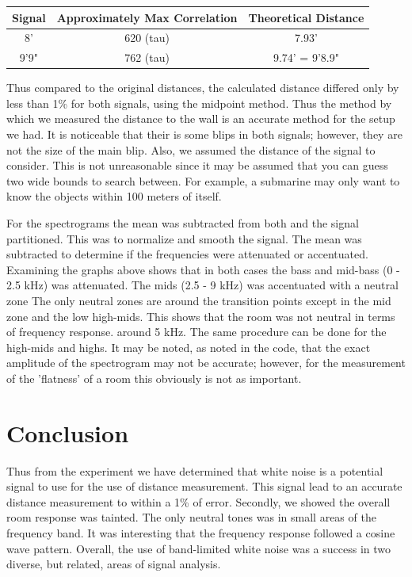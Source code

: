 \documentclass{article}
\begin{document}
      \begin{tabular}{|c|c|c|}
         \hline
         Signal & Approximately Max Correlation & Theoretical Distance \\
         \hline
         8' & 620 (tau) & 7.93'\\
         9'9" & 762 (tau) & 9.74' = 9'8.9"\\
         \hline
      \end{tabular}

      Thus compared to the original distances, the calculated distance differed
      only by less than 1\% for both signals, using the midpoint method. Thus
      the method by which we measured the distance to the wall is an accurate
      method for the setup we had. It is noticeable that their is some blips
      in both signals; however, they are not the size of the main blip. Also, we
      assumed the distance of the signal to consider. This is not unreasonable
      since it may be assumed that you can guess two wide bounds to search
      between. For example, a submarine may only want to know the objects within
      100 meters of itself.

      For the spectrograms the mean was subtracted from both and the signal
      partitioned. This was to normalize and smooth the signal.
      The mean was subtracted to
      determine if the frequencies were attenuated or accentuated. Examining the
      graphs above shows that in both cases the bass and mid-bass (0 - 2.5 kHz)
      was attenuated. The mids (2.5 - 9 kHz) was accentuated with a neutral zone
      The only neutral zones are around the transition points except in the
      mid zone and the low high-mids. This shows that the room was not
      neutral in terms of frequency response.
      around 5 kHz. The same procedure can be done for the high-mids and highs. 
      It may be noted, as noted in the code, that the exact amplitude of the
      spectrogram may not be accurate; however, for the measurement of the
      'flatness' of a room this obviously is not as important.

   \section{Conclusion}
      Thus from the experiment we have determined that white noise is a
      potential signal to use for the use of distance measurement. This
      signal lead to an accurate distance
      measurement to within a 1\% of error. Secondly,
      we showed the overall room response was tainted. The only neutral tones
      was in small areas of the frequency band. It was interesting that the
      frequency response followed a cosine wave pattern. Overall, the use of
      band-limited white noise was a success in two diverse, but
      related, areas of signal analysis.
\end{document}
